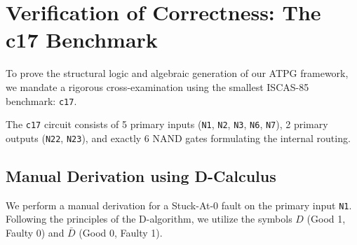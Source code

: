 \documentclass[11pt,a4paper]{article}
\begin{document}
\section{Verification of Correctness: The c17 Benchmark}
To prove the structural logic and algebraic generation of our ATPG framework, we mandate a rigorous cross-examination using the smallest ISCAS-85 benchmark: \texttt{c17}. 

The \texttt{c17} circuit consists of 5 primary inputs (\texttt{N1}, \texttt{N2}, \texttt{N3}, \texttt{N6}, \texttt{N7}), 2 primary outputs (\texttt{N22}, \texttt{N23}), and exactly 6 NAND gates formulating the internal routing.

\subsection{Manual Derivation using D-Calculus}
We perform a manual derivation for a Stuck-At-0 fault on the primary input \texttt{N1}. Following the principles of the D-algorithm, we utilize the symbols $D$ (Good 1, Faulty 0) and $\bar{D}$ (Good 0, Faulty 1).
\end{document}
